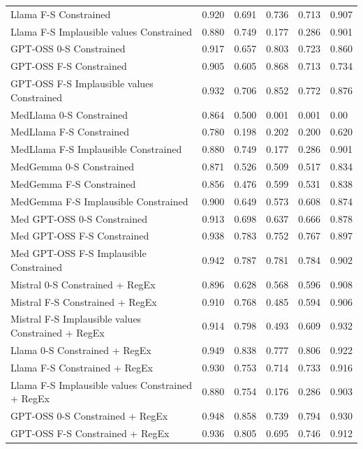 \begin{tabular}{l|llll|l}
Llama F-S Constrained &  0.920  & 0.691  &  0.736 & 0.713 & 0.907 \\
Llama F-S Implausible values Constrained & 0.880  &   0.749   &   0.177  &   0.286 & 0.901 \\
GPT-OSS 0-S Constrained & 0.917  &   0.657   &   0.803  &   0.723 & 0.860  \\
GPT-OSS F-S Constrained & 0.905  &   0.605   &   0.868  &   0.713 & 0.734  \\
GPT-OSS F-S Implausible values  Constrained & 0.932  &   0.706   &   0.852  &   0.772 & 0.876 \\
MedLlama 0-S Constrained & 0.864 & 0.500 & 0.001 & 0.001 & 0.00 \\
MedLlama F-S Constrained &  0.780  & 0.198  &  0.202 & 0.200 & 0.620 \\
MedLlama F-S Implausible Constrained & 0.880 & 0.749 & 0.177 & 0.286 & 0.901 \\
MedGemma 0-S Constrained & 0.871  &   0.526   &   0.509 &   0.517 & 0.834   \\
MedGemma F-S Constrained &  0.856  &   0.476   &  0.599   &  0.531 & 0.838  \\
MedGemma F-S Implausible Constrained & 0.900 & 0.649 & 0.573 & 0.608 & 0.874 \\
Med GPT-OSS 0-S Constrained & 0.913  &   0.698   &   0.637 &   0.666 & 0.878   \\
Med GPT-OSS F-S Constrained &  0.938  &   0.783   &  0.752   &  0.767 & 0.897  \\
Med GPT-OSS F-S Implausible Constrained & 0.942 & 0.787 & 0.781 & 0.784 & 0.902 \\
Mistral 0-S  Constrained + RegEx & 0.896  &   0.628   &   0.568 &   0.596  & 0.908  \\
Mistral F-S  Constrained + RegEx &  0.910  &   0.768   &  0.485   &   0.594 & 0.906  \\
Mistral F-S Implausible values  Constrained + RegEx & 0.914  &   0.798   &   0.493  &   0.609 & 0.932 \\
Llama 0-S  Constrained + RegEx & 0.949 & 0.838 & 0.777 & 0.806 & 0.922 \\
Llama F-S  Constrained + RegEx & 0.930 & 0.753 & 0.714 & 0.733 & 0.916 \\
Llama F-S Implausible values  Constrained + RegEx & 0.880  &   0.754   &   0.176  &   0.286 & 0.903  \\
GPT-OSS 0-S  Constrained + RegEx & 0.948  &   0.858  &   0.739  &   0.794 & 0.930  \\
GPT-OSS F-S  Constrained + RegEx & 0.936  &   0.805   &   0.695  &   0.746 & 0.912 \\

\end{tabular}
